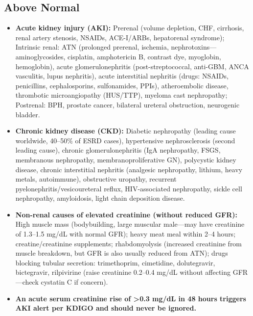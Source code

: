 \subsection*{Above Normal}
\begin{itemize}
  \item \textbf{Acute kidney injury (AKI):} Prerenal (volume depletion, CHF, cirrhosis, renal artery stenosis, NSAIDs, ACE-I/ARBs, hepatorenal syndrome); Intrinsic renal: ATN (prolonged prerenal, ischemia, nephrotoxins---aminoglycosides, cisplatin, amphotericin B, contrast dye, myoglobin, hemoglobin), acute glomerulonephritis (post-streptococcal, anti-GBM, ANCA vasculitis, lupus nephritis), acute interstitial nephritis (drugs: NSAIDs, penicillins, cephalosporins, sulfonamides, PPIs), atheroembolic disease, thrombotic microangiopathy (HUS/TTP), myeloma cast nephropathy; Postrenal: BPH, prostate cancer, bilateral ureteral obstruction, neurogenic bladder.
  \item \textbf{Chronic kidney disease (CKD):} Diabetic nephropathy (leading cause worldwide, 40--50\% of ESRD cases), hypertensive nephrosclerosis (second leading cause), chronic glomerulonephritis (IgA nephropathy, FSGS, membranous nephropathy, membranoproliferative GN), polycystic kidney disease, chronic interstitial nephritis (analgesic nephropathy, lithium, heavy metals, autoimmune), obstructive uropathy, recurrent pyelonephritis/vesicoureteral reflux, HIV-associated nephropathy, sickle cell nephropathy, amyloidosis, light chain deposition disease.
  \item \textbf{Non-renal causes of elevated creatinine (without reduced GFR):} High muscle mass (bodybuilding, large muscular male---may have creatinine of 1.3--1.5 mg/dL with normal GFR); heavy meat meal within 2--4 hours; creatine/creatinine supplements; rhabdomyolysis (increased creatinine from muscle breakdown, but GFR is also usually reduced from ATN); drugs blocking tubular secretion: trimethoprim, cimetidine, dolutegravir, bictegravir, rilpivirine (raise creatinine 0.2--0.4 mg/dL without affecting GFR---check cystatin C if concern).
  \item \textbf{An acute serum creatinine rise of >0.3 mg/dL in 48 hours triggers AKI alert per KDIGO and should never be ignored.}
\end{itemize}

